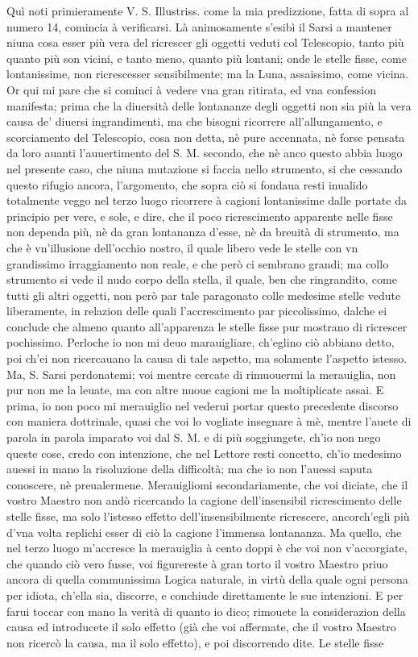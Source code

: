 \documentclass[11pt,twoside,openany]{book}
\begin{document}
Quì noti primieramente V. S. Illustriss. come la mia predizzione, fatta di sopra al numero 14, comincia à verificarsi. Là animosamente s'esibì il Sarsi a mantener niuna cosa esser più vera del ricrescer gli oggetti veduti col Telescopio, tanto più quanto più son vicini, e tanto meno, quanto più lontani; onde le stelle fisse, come lontanissime, non ricrescesser sensibilmente; ma la Luna, assaissimo, come vicina. Or qui mi pare che si cominci à vedere vna gran ritirata, ed vna confession manifesta; prima che la diuersità delle lontananze degli oggetti non sia più la vera causa de' diuersi ingrandimenti, ma che bisogni ricorrere all'allungamento, e scorciamento del Telescopio, cosa non detta, nè pure accennata, nè forse pensata da loro auanti l'auuertimento del S. M. secondo, che nè anco questo abbia luogo nel presente caso, che niuna mutazione si faccia nello strumento, si che cessando questo rifugio ancora, l'argomento, che sopra ciò si fondaua resti inualido totalmente veggo nel terzo luogo ricorrere à cagioni lontanissime dalle portate da principio per vere, e sole, e dire, che il poco ricrescimento apparente nelle fisse non dependa più, nè da gran lontananza d'esse, nè da breuità di strumento, ma che è vn'illusione dell'occhio nostro, il quale libero vede le stelle con vn grandissimo irraggiamento non reale, e che però ci sembrano grandi; ma collo strumento si vede il nudo corpo della stella, il quale, ben che ringrandito, come tutti gli altri oggetti, non però par tale paragonato colle medesime stelle vedute liberamente, in relazion delle quali l'accrescimento par piccolissimo, dalche ei conclude che almeno quanto all'apparenza le stelle fisse pur mostrano di ricrescer pochissimo. Perloche io non mi deuo marauigliare, ch'eglino ciò abbiano detto, poi ch'ei non ricercauano la causa di tale aspetto, ma solamente l'aspetto istesso. Ma, S. Sarsi perdonatemi; voi mentre cercate di rimuouermi la merauiglia, non pur non me la leuate, ma con altre nuoue cagioni me la moltiplicate assai. E prima, io non poco mi merauiglio nel vederui portar questo precedente discorso con maniera dottrinale, quasi che voi lo vogliate insegnare à mè, mentre l'auete di parola in parola imparato voi dal S. M. e di più soggiungete, ch'io non nego queste cose, credo con intenzione, che nel Lettore resti concetto, ch'io medesimo auessi in mano la risoluzione della difficoltà; ma che io non l'auessi saputa conoscere, nè preualermene. Merauigliomi secondariamente, che voi diciate, che il vostro Maestro non andò ricercando la cagione dell'insensibil ricrescimento delle stelle fisse, ma solo l'istesso effetto dell'insensibilmente ricrescere, ancorch'egli più d'vna volta replichi esser di ciò la cagione l'immensa lontananza. Ma quello, che nel terzo luogo m'accresce la merauiglia à cento doppi è che voi non v'accorgiate, che quando ciò vero fusse, voi figurereste à gran torto il vostro Maestro priuo ancora di quella communissima Logica naturale, in virtù della quale ogni persona per idiota, ch'ella sia, discorre, e conchiude direttamente le sue intenzioni. E per farui toccar con mano la verità di quanto io dico; rimouete la considerazion della causa ed introducete il solo effetto (già che voi affermate, che il vostro Maestro non ricercò la causa, ma il solo effetto), e poi discorrendo dite. Le stelle fisse 
\end{document}

